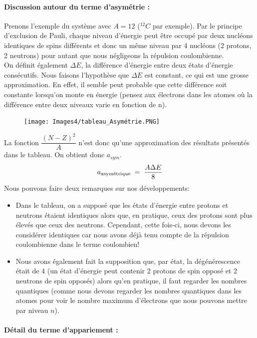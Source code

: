 \paragraph{Discussion autour du terme d'asymétrie :} 


Prenons l'exemple du système avec $A = 12$ ($^{12}C$ par exemple). Par le principe d'exclusion de Pauli, chaque niveau d'énergie peut être occupé par deux nucléons identiques de spins différents et donc un même niveau par 4 nucléons (2 protons, 2 neutrons) pour autant que nous négligeons la répulsion coulombienne.\\
On définit également $\Delta E$, la différence d'énergie entre deux états d'énergie consécutifs. Nous faisons l'hypothèse que $\Delta E$ est constant, ce qui est une grosse approximation. En effet, il semble peut probable que cette différence soit constante lorsqu'on monte en énergie (pensez aux électrons dans les atomes où la différence entre deux niveaux varie en fonction de n).\\
\begin{figure}[ht]
    \centering
    \texttt{[image: Images4/tableau\_Asymétrie.PNG]}
\end{figure}
La fonction $\dfrac{(N-Z)^2}{A}$ n'est donc qu'une approximation des résultats présentés dans le tableau. On obtient donc $a_{sym}$.
\[
    a_{\text{asymétrique}} \; = \; \dfrac{A\Delta E}{8}
\]
Nous pouvons faire deux remarques sur nos développements:
\begin{itemize}
    \item Dans le tableau, on a supposé que les états d'énergie entre protons et neutrons étaient identiques alors que, en pratique, ceux des protons sont plus élevés que ceux des neutrons. Cependant, cette fois-ci, nous devons les considérer identiques car nous avons déjà tenu compte de la répulsion coulombienne dans le terme coulombien!
    \item Nous avons également fait la supposition que, par état, la dégénérescence était de 4 (un état d'énergie peut contenir 2 protons de spin opposé et 2 neutrons de spin opposés) alors qu'en pratique, il faut regarder les nombres quantiques (comme nous devons regarder les nombres quantiques dans les atomes pour voir le nombre maximum d'électrons que nous pouvons mettre par niveau $n$).
\end{itemize}

\paragraph{Détail du terme d'appariement :} 


